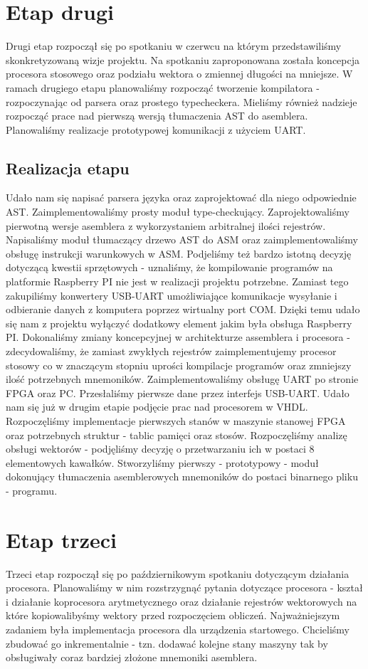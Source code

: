\section{Etap drugi}
Drugi etap rozpoczął się po spotkaniu w czerwcu na którym przedstawiliśmy skonkretyzowaną wizje projektu. Na spotkaniu zaproponowana została koncepcja procesora stosowego oraz podziału wektora o zmiennej długości na mniejsze. W ramach drugiego etapu planowaliśmy rozpocząć tworzenie kompilatora - rozpoczynając od parsera oraz prostego typecheckera. Mieliśmy również nadzieje rozpocząć prace nad pierwszą wersją tłumaczenia AST do asemblera. Planowaliśmy realizacje prototypowej komunikacji z użyciem UART.
\subsection{Realizacja etapu}
Udało nam się napisać parsera języka oraz zaprojektować dla niego odpowiednie AST. Zaimplementowaliśmy prosty moduł type-checkujący. Zaprojektowaliśmy pierwotną wersje asemblera z wykorzystaniem arbitralnej ilości rejestrów. Napisaliśmy moduł tłumaczący drzewo AST do ASM oraz zaimplementowaliśmy obsługę instrukcji warunkowych w ASM. Podjeliśmy też bardzo istotną decyzję dotyczącą kwestii sprzętowych - uznaliśmy, że kompilowanie programów na platformie Raspberry PI nie jest w realizacji projektu potrzebne. Zamiast tego zakupiliśmy konwertery USB-UART umożliwiające komunikacje wysyłanie i odbieranie danych z komputera poprzez wirtualny port COM. Dzięki temu udało się nam z projektu wyłączyć dodatkowy element jakim była obsługa Raspberry PI. Dokonaliśmy zmiany koncepcyjnej w architekturze assemblera i procesora - zdecydowaliśmy, że zamiast zwykłych rejestrów zaimplementujemy procesor stosowy co w znaczącym stopniu uprości kompilacje programów oraz zmniejszy ilość potrzebnych mnemoników. Zaimplementowaliśmy obsługę UART po stronie FPGA oraz PC. Przesłaliśmy pierwsze dane przez interfejs USB-UART. Udało nam się już w drugim etapie podjęcie prac nad procesorem w VHDL. Rozpoczęliśmy implementacje pierwszych stanów w maszynie stanowej FPGA oraz potrzebnych struktur - tablic pamięci oraz stosów. Rozpoczęliśmy analizę obsługi wektorów - podjęliśmy decyzję o przetwarzaniu ich w postaci 8 elementowych kawałków. Stworzyliśmy pierwszy - prototypowy - moduł dokonujący tłumaczenia asemblerowych mnemoników do postaci binarnego pliku - programu.
\section{Etap trzeci}
Trzeci etap rozpoczął się po październikowym spotkaniu dotyczącym działania procesora. Planowaliśmy w nim rozstrzygnąć pytania dotyczące procesora - kształ i działanie koprocesora arytmetycznego oraz działanie rejestrów wektorowych na które kopiowalibyśmy wektory przed rozpoczęciem obliczeń. Najważniejszym zadaniem była implementacja procesora dla urządzenia startowego. Chcieliśmy zbudować go inkrementalnie - tzn. dodawać kolejne stany maszyny tak by obsługiwały coraz bardziej złożone mnemoniki asemblera.
